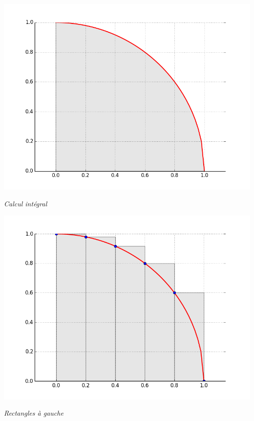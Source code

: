 \documentclass[10pt,fleqn]{article} %
\begin{document}
\begin{minipage}[c]{.24\linewidth}
\begin{center}
\includegraphics[width=.99\textwidth]{images/pi_courbe}

\textit{Calcul intégral}
\end{center}
\end{minipage}\hfill
\begin{minipage}[c]{.24\linewidth}
\begin{center}
\includegraphics[width=.99\textwidth]{images/pi_rect_g}

\textit{Rectangles à gauche}
\end{center}
\end{minipage}\hfill
\end{document}
